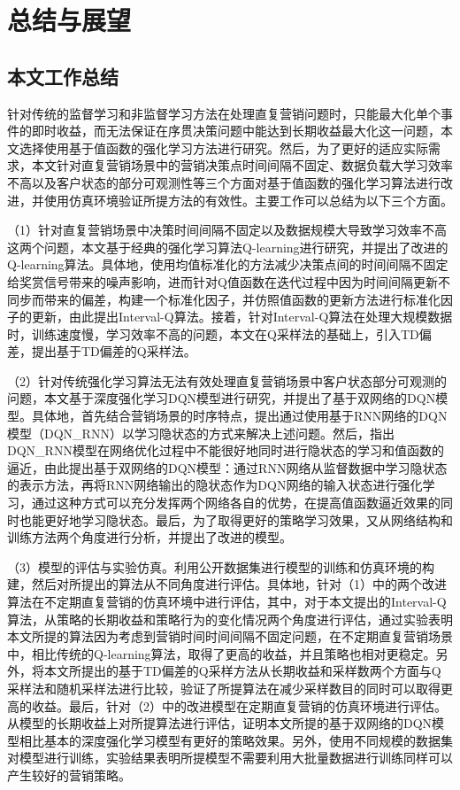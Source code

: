 \chapter{总结与展望}

\section{本文工作总结}
针对传统的监督学习和非监督学习方法在处理直复营销问题时，只能最大化单个事件的即时收益，而无法保证在序贯决策问题中能达到长期收益最大化这一问题，本文选择使用基于值函数的强化学习方法进行研究。然后，为了更好的适应实际需求，本文针对直复营销场景中的营销决策点时间间隔不固定、数据负载大学习效率不高以及客户状态的部分可观测性等三个方面对基于值函数的强化学习算法进行改进，并使用仿真环境验证所提方法的有效性。主要工作可以总结为以下三个方面。

（1）针对直复营销场景中决策时间间隔不固定以及数据规模大导致学习效率不高这两个问题，本文基于经典的强化学习算法Q-learning进行研究，并提出了改进的Q-learning算法。具体地，使用均值标准化的方法减少决策点间的时间间隔不固定给奖赏信号带来的噪声影响，进而针对Q值函数在迭代过程中因为时间间隔更新不同步而带来的偏差，构建一个标准化因子，并仿照值函数的更新方法进行标准化因子的更新，由此提出Interval-Q算法。接着，针对Interval-Q算法在处理大规模数据时，训练速度慢，学习效率不高的问题，本文在Q采样法的基础上，引入TD偏差，提出基于TD偏差的Q采样法。

（2）针对传统强化学习算法无法有效处理直复营销场景中客户状态部分可观测的问题，本文基于深度强化学习DQN模型进行研究，并提出了基于双网络的DQN模型。具体地，首先结合营销场景的时序特点，提出通过使用基于RNN网络的DQN模型（DQN_RNN）以学习隐状态的方式来解决上述问题。然后，指出DQN_RNN模型在网络优化过程中不能很好地同时进行隐状态的学习和值函数的逼近，由此提出基于双网络的DQN模型：通过RNN网络从监督数据中学习隐状态的表示方法，再将RNN网络输出的隐状态作为DQN网络的输入状态进行强化学习，通过这种方式可以充分发挥两个网络各自的优势，在提高值函数逼近效果的同时也能更好地学习隐状态。最后，为了取得更好的策略学习效果，又从网络结构和训练方法两个角度进行分析，并提出了改进的模型。

（3）模型的评估与实验仿真。利用公开数据集进行模型的训练和仿真环境的构建，然后对所提出的算法从不同角度进行评估。具体地，针对（1）中的两个改进算法在不定期直复营销的仿真环境中进行评估，其中，对于本文提出的Interval-Q算法，从策略的长期收益和策略行为的变化情况两个角度进行评估，通过实验表明本文所提的算法因为考虑到营销时间时间间隔不固定问题，在不定期直复营销场景中，相比传统的Q-learning算法，取得了更高的收益，并且策略也相对更稳定。另外，将本文所提出的基于TD偏差的Q采样方法从长期收益和采样数两个方面与Q采样法和随机采样法进行比较，验证了所提算法在减少采样数目的同时可以取得更高的收益。最后，针对（2）中的改进模型在定期直复营销的仿真环境进行评估。从模型的长期收益上对所提算法进行评估，证明本文所提的基于双网络的DQN模型相比基本的深度强化学习模型有更好的策略效果。另外，使用不同规模的数据集对模型进行训练，实验结果表明所提模型不需要利用大批量数据进行训练同样可以产生较好的营销策略。

